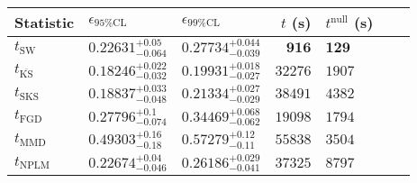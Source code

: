 \begin{tabular}{l|llr|llr}
Statistic & $\epsilon_{95\%\mathrm{CL}}$ & $\epsilon_{99\%\mathrm{CL}}$ & $t$ (s) & $t^{\mathrm{null}}$ (s) \\
	\midrule
	$t_{\mathrm{SW}}$ & $0.22631_{-0.064}^{+0.05}$ & $0.27734_{-0.039}^{+0.044}$ & ${\mathbf{916}}$ & ${\mathbf{129}}$ \\
	$t_{\overline{\mathrm{KS}}}$ & ${\mathbf{0.18246_{-0.032}^{+0.022}}}$ & ${\mathbf{0.19931_{-0.027}^{+0.018}}}$ & $32276$ & $1907$ \\
	$t_{\mathrm{SKS}}$ & $0.18837_{-0.048}^{+0.033}$ & $0.21334_{-0.029}^{+0.027}$ & $38491$ & $4382$ \\
	$t_{\mathrm{FGD}}$ & $0.27796_{-0.074}^{+0.1}$ & $0.34469_{-0.062}^{+0.068}$ & $19098$ & $1794$ \\
	$t_{\mathrm{MMD}}$ & $0.49303_{-0.18}^{+0.16}$ & $0.57279_{-0.11}^{+0.12}$ & $55838$ & $3504$ \\
\rowcolor{red!35}	$t_{\mathrm{NPLM}}$ & $0.22674_{-0.046}^{+0.04}$ & $0.26186_{-0.041}^{+0.029}$ & $37325$ & $8797$ \\
	\bottomrule
\end{tabular}